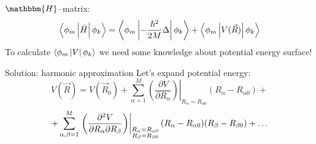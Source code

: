 \begin{frame}{  }
\begin{block}{$\mathbbm{H}$--matrix:}
$$\mymean{\phi_m}{\hat{H}}{\phi_k} = \mymean{\phi_m}%
					    {-\frac{\hbar^2}{2M}\Delta}%
					    {\phi_k}+%
                                     \mymean{\phi_m}{V(\vec{R})}{\phi_k}$$
To calculate $\left\langle \phi_m \left| V \right| \phi_k \right\rangle$ we need some knowledge about potential energy surface!
\end{block}
\begin{block}{Solution: harmonic approximation}
Let's expand potential energy:
$$V(\vec{R}) = V(\vec{R}_0) + %
		      \sum_{\alpha=1}^M\left.\left(\frac{\partial V}{\partial R_{\alpha}}\right)\right|_{R_{\alpha}=R_{\alpha 0}}%
		 		       (R_{\alpha} - R_{\alpha 0})+$$
$$+\sum_{\alpha,\beta=1}^M\left.\left(\frac{\partial^2 V}{\partial R_{\alpha}\partial R_{\beta}}\right)\right|_%
			  {\substack{R_{\alpha}=R_{\alpha 0}\\R_{\beta}=R_{\beta 0}}}%
			  (R_{\alpha}-R_{\alpha 0})(R_{\beta}-R_{\beta 0})+\ldots$$
\end{block}
\end{frame}


